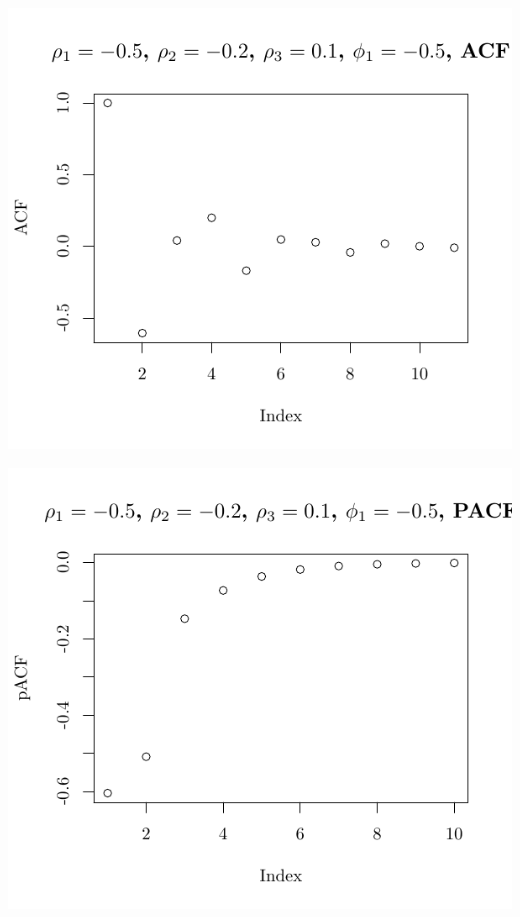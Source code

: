 \documentclass[10pt]{paper}\usepackage[]{graphicx}\usepackage[]{color}
\makeatletter
\def\maxwidth{ %
  \ifdim\Gin@nat@width>\linewidth
    \linewidth
  \else
    \Gin@nat@width
  \fi
}
\newenvironment{knitrout}{}{} %
\makeatother
\begin{document}
\begin{knitrout}
{\centering \includegraphics[width=\maxwidth]{figure/graphics-plotter-117} 

}




{\centering \includegraphics[width=\maxwidth]{figure/graphics-plotter-118} 

}





\end{knitrout}
\end{document}
